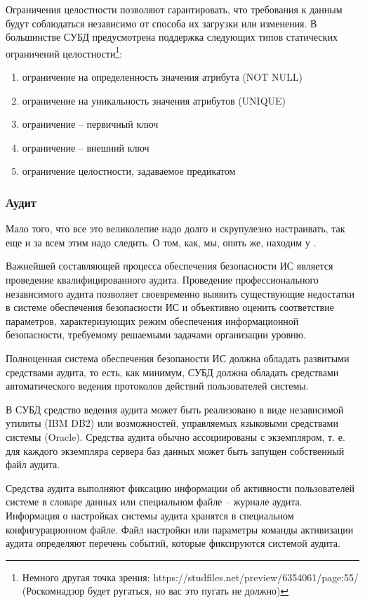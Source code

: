 Ограничения целостности позволяют гарантировать, что требования к данным будут соблюдаться независимо от способа их загрузки или изменения. В большинстве СУБД предусмотрена поддержка следующих типов статических ограничений целостности\footnote{Немного другая точка зрения: https://studfiles.net/preview/6354061/page:55/ (Роскомнадзор будет ругаться, но вас это пугать не должно)}:
\begin{enumerate}
	\item ограничение на определенность значения атрибута (NOT NULL)
	\item ограничение на уникальность значения атрибутов (UNIQUE)
	\item ограничение -- первичный ключ
	\item ограничение -- внешний ключ
	\item ограничение целостности, задаваемое предикатом
\end{enumerate}

\subsubsection{Аудит}
Мало того, что все это великолепие надо долго и скрупулезно настраивать, так еще и за всем этим надо следить. О том, как, мы, опять же, находим у \autocite{Smirnov2007}.
\begin{grayquote}
	Важнейшей составляющей процесса обеспечения безопасности ИС является проведение квалифицированного аудита. Проведение профессионального независимого аудита позволяет своевременно выявить существующие недостатки в системе обеспечения безопасности ИС и объективно оценить соответствие параметров, характеризующих режим обеспечения информационной безопасности, требуемому решаемыми задачами организации уровню.
\end{grayquote}

Полноценная система обеспечения безопаности ИС должна обладать развитыми средствами аудита, то есть, как минимум, СУБД должна обладать средствами автоматического ведения протоколов действий пользователей системы.

В СУБД средство ведения аудита может быть реализовано в виде независимой утилиты (IBM DB2) или возможностей, управляемых языковыми средствами системы (Oracle). Средства аудита обычно ассоциированы с экземпляром, т. е. для каждого экземпляра сервера баз данных может быть запущен собственный файл аудита.

Средства аудита выполняют фиксацию информации об активности пользователей системе в словаре данных или специальном файле – журнале аудита. Информация о настройках системы аудита хранятся в специальном конфигурационном файле. Файл настройки или параметры команды активизации аудита определяют перечень событий, которые фиксируются системой аудита.

